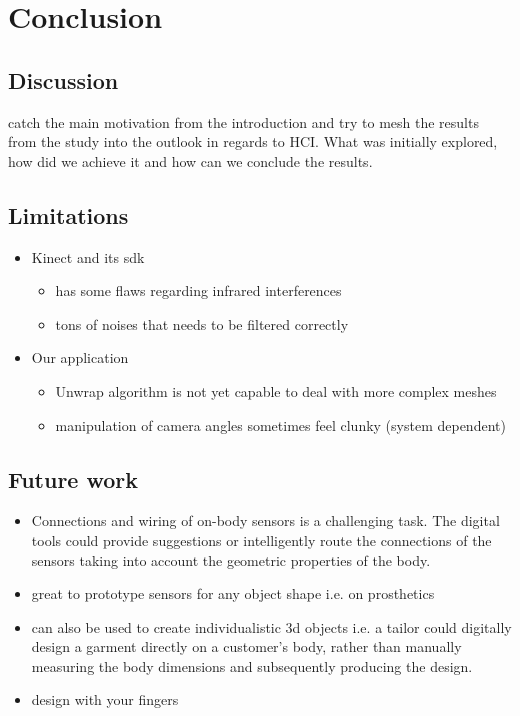 

%

\section{Conclusion}
\subsection{Discussion}
catch the main motivation from the introduction and try to mesh the results from the study into the outlook in regards to HCI. What was initially explored, how did we achieve it and how can we conclude the results.
\subsection{Limitations} 
\begin{itemize}
\item Kinect and its sdk
\begin{itemize}
\item has some flaws regarding infrared interferences
\item tons of noises that needs to be filtered correctly
\end{itemize}
\item Our application
\begin{itemize}
\item Unwrap algorithm is not yet capable to deal with more complex meshes
\item manipulation of camera angles sometimes feel clunky (system dependent)
\end{itemize}
\end{itemize}
\subsection{Future work}
\begin{itemize}
\item Connections and wiring of on-body sensors is a challenging task. The digital tools could provide suggestions or intelligently route the connections of the sensors taking into account the geometric properties of the body.
\item great to prototype sensors for any object shape i.e. on prosthetics
\item can also be used to create individualistic 3d objects i.e. a tailor could digitally design a garment directly on a customer’s body, rather than manually measuring the body dimensions and subsequently producing the design.
\item design with your fingers
\end{itemize}
